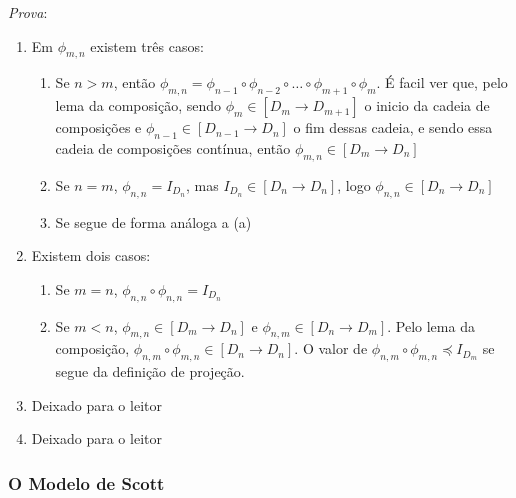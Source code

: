 \documentclass[../main.tex]{subfiles}
\begin{document}
\emph{Prova}: \begin{enumerate}
    \item Em $\phi_{m,n}$ existem três casos:
    \begin{enumerate}
        \item Se $n > m$, então $\phi_{m,n} = \phi_{n - 1} \circ \phi_{n - 2} \circ \dots \circ \phi_{m + 1} \circ \phi_{m}$. É facil ver que, pelo lema da composição, sendo $\phi_m \in [D_m \to D_{m+1}]$ o inicio da cadeia de composições e $\phi_{n-1} \in [D_{n-1} \to D_{n}]$ o fim dessas cadeia, e sendo essa cadeia de composições contínua, então $\phi_{m,n} \in [D_m \to D_n]$
        \item Se $n = m$, $\phi_{n,n} = I_{D_n}$, mas $I_{D_n} \in [D_n \to D_n]$, logo $\phi_{n,n} \in [D_n \to D_n]$
        \item Se segue de forma análoga a (a)
    \end{enumerate}
    \item Existem dois casos:
    \begin{enumerate}
        \item Se $m = n$, $\phi_{n,n} \circ \phi_{n,n} = I_{D_n}$
        \item Se $m < n$, $\phi_{m,n} \in [D_m \to D_n]$ e $\phi_{n,m} \in [D_n \to D_m]$. Pelo lema da composição, $\phi_{n, m} \circ \phi_{m,n} \in [D_n \to D_n]$. O valor de $\phi_{n, m} \circ \phi_{m,n} \preceq I_{D_m}$ se segue da definição de projeção.
    \end{enumerate}
    \item Deixado para o leitor \item Deixado para o leitor
\end{enumerate}

\subsubsection{O Modelo de Scott}
\end{document}
